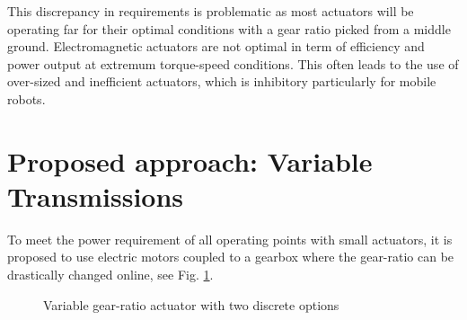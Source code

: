 This discrepancy in requirements is problematic as most actuators will be operating far for their optimal conditions with a gear ratio picked from a middle ground. Electromagnetic actuators are not optimal in term of efficiency and power output at extremum torque-speed conditions. This often leads to the use of over-sized and inefficient actuators, which is inhibitory particularly for mobile robots.


%




\section{Proposed approach: Variable Transmissions}
\label{sec:ProposedSolutionRobotsUsingMultipleGearRatioActuators}


To meet the power requirement of all operating points with small actuators, it is proposed to use electric motors coupled to a gearbox where the gear-ratio can be drastically changed online, see Fig. \ref{fig:2s}. 

\begin{figure}[htb]
        \centering
        \caption{Variable gear-ratio actuator with two discrete options}\label{fig:2s}
\end{figure}


